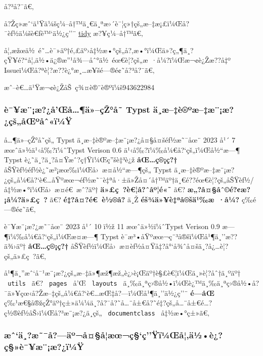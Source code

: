 å?³å?¯ã€‚

å?Žç»­æˆ`ä¹Ÿä¼šç¼--å†™ä¸€ä¸ªæ›´è¯¦ç»†çš„æ--‡æ¡£ï¼Œå?¯èƒ½ä¼šè€ƒè™`ä½¿ç''¨
\href{https://github.com/typst/packages/tree/main/packages/preview/tidy/0.1.0}{tidy}
æ?¥ç¼--å†™ã€‚

å¦‚æžœä½~é˜\ldots è¯»äº†é‚£äº›å‡½æ•°çš„å?‚æ•°ï¼Œä»?ç„¶ä¸?çŸ¥é?{}``å¦‚ä½•ä¿®æ''¹å¾---åˆ°ä½~éœ€è¦?çš„æ~·å¼?ï¼Œæ¬¢è¿Žæ??å‡º
Issueï¼Œå?ªè¦?æ??è¿°æ¸\ldots æ¥šé---®é¢˜å?³å?¯ã€‚

æˆ--è€\ldots ä¹Ÿæ¬¢è¿ŽåŠ~ç¾¤è®¨è®ºï¼š943622984

\subsubsection{è¯¥æ¨¡æ?¿å'Œå\ldots¶ä»--çŽ°å­˜ Typst
ä¸­æ--‡è®ºæ--‡æ¨¡æ?¿çš„åŒºåˆ«ï¼Ÿ}\label{uxe8uxe6uxe6uxe5ux153uxe5uxe4uxe7ux17euxe5-typst-uxe4uxe6uxe8uxbauxe6uxe6uxe6uxe7ux161uxe5ux153uxbauxe5ux2c6uxefuxbcuxff}

å\ldots¶ä»--çŽ°å­˜çš„ Typst ä¸­æ--‡è®ºæ--‡æ¨¡æ?¿å¤§å¤šéƒ½æ˜¯åœ¨ 2023 å¹´ 7
æœˆä»½ä¹‹å‰?ï¼ˆTypst Verison 0.6 ä¹‹å‰?ï¼‰å¼€å?{}`çš„ï¼Œå½``æ---¶ Typst
è¿˜ä¸?ä¸?å¤Ÿæˆ?ç†Ÿï¼Œç''šè‡³è¿ž \textbf{åŒ\ldots ç®¡ç?†}
åŠŸèƒ½éƒ½è¿˜æ²¡æœ‰ï¼Œå›~æ­¤å½``æ---¶çš„ Typst
ä¸­æ--‡è®ºæ--‡æ¨¡æ?¿çš„å¼€å?{}`è€\ldots åŸºæœ¬éƒ½æ˜¯è‡ªå·±ä»Žå¤´å†™äº†ä¸€é??éœ€è¦?çš„åŠŸèƒ½/å‡½æ•°ï¼Œå›~æ­¤é€~æˆ?äº†
\textbf{ä»£ç~?è€¦å?ˆåº¦é«˜} ã€? \textbf{æ„?å¤§åˆ©é?¢æ?¡å¼?ä»£ç~?} ã€?
\textbf{é‡?å¤?é€~è½®å­?} ä¸Ž \textbf{éš¾ä»¥è‡ªå®šä¹‰æ~·å¼?} ç­‰é---®é¢˜ã€‚

è¯¥æ¨¡æ?¿æ˜¯åœ¨ 2023 å¹´ 10 ï½ž 11 æœˆä»½ï¼ˆTypst Verison 0.9
æ---¶ï¼‰å¼€å?{}`çš„ï¼Œæ­¤æ---¶ Typst è¯­æ³•åŸºæœ¬ç¨³å®šï¼Œå¹¶ä¸''æ??ä¾›äº†
\textbf{åŒ\ldots ç®¡ç?†}
åŠŸèƒ½ï¼Œå›~æ­¤èƒ½å¤Ÿå‡?å°`å¾ˆå¤šä¸?å¿\ldots è¦?çš„ä»£ç~?ã€‚

å¹¶ä¸''æˆ`å¯¹æ¨¡æ?¿çš„æ--‡ä»¶æž¶æž„è¿›è¡Œäº†è§£è€¦ï¼Œä¸»è¦?åˆ†ä¸ºäº†
\texttt{\ utils\ } ã€? \texttt{\ pages\ } å'Œ \texttt{\ layouts\ }
ä¸‰ä¸ªç›®å½•ï¼Œè¿™ä¸‰ä¸ªç›®å½•å?¯ä»¥çœ‹å?Žæ--‡çš„å¼€å?{}`è€\ldots æŒ‡å?---ï¼Œå¹¶ä¸''ä½¿ç''¨
\textbf{é---­åŒ}
ç‰¹æ€§å®žçŽ°äº†ç±»ä¼¼ä¸?å?¯å?˜å\ldots¨å±€å?˜é‡?çš„å\ldots¨å±€é\ldots?ç½®èƒ½åŠ›ï¼Œå?³æ¨¡æ?¿ä¸­çš„
\texttt{\ documentclass\ } å‡½æ•°ç±»ã€‚

\subsubsection{æˆ`ä¸?æ˜¯å?---äº¬å¤§å­¦æœ¬ç§`ç''Ÿï¼Œå¦‚ä½•è¿?ç§»è¯¥æ¨¡æ?¿ï¼Ÿ}\label{uxe6ux2c6uxe4uxe6uxe5uxe4uxbauxe5uxe5uxe6ux153uxe7uxe7uxffuxefuxbcux153uxe5uxe4uxbduxe8uxe7uxe8uxe6uxe6uxefuxbcuxff}


